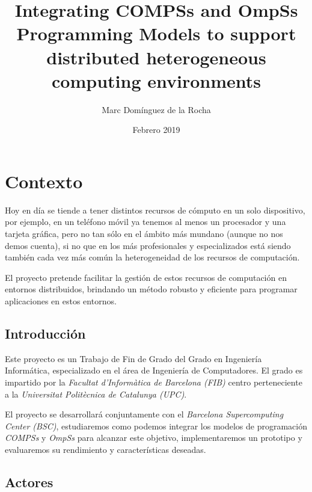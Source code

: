 \documentclass{article}
\title{Integrating COMPSs and OmpSs Programming Models to support distributed heterogeneous computing environments}
\author{Marc Domínguez de la Rocha}
\date{Febrero 2019}
\begin{document}
\maketitle

\newpage
\renewcommand{\contentsname}{Índice}
\tableofcontents
\newpage


\section{Contexto}

Hoy en día se tiende a tener distintos recursos de cómputo en un solo dispositivo, por ejemplo, en un teléfono móvil ya tenemos al menos un procesador y una tarjeta gráfica, pero no tan sólo en el ámbito más mundano (aunque no nos demos cuenta), si no que en los más profesionales y especializados está siendo también cada vez más común la heterogeneidad de los recursos de computación. 
\par\bigskip

El proyecto pretende facilitar la gestión de estos recursos de computación en entornos distribuidos, brindando un método robusto y eficiente para programar aplicaciones en estos entornos.


\subsection{Introducción}

Este proyecto es un Trabajo de Fin de Grado del Grado en Ingeniería Informática, especializado en el área de Ingeniería de Computadores. El grado es impartido por la \textit{Facultat d'Informàtica de Barcelona (FIB)} centro perteneciente a la \textit{Universitat Politècnica de Catalunya (UPC)}. 
\par\bigskip

El proyecto se desarrollará conjuntamente con el \textit{Barcelona Supercomputing Center (BSC)}, estudiaremos como podemos integrar los modelos de programación \textit{COMPSs} y \textit{OmpSs} para alcanzar este objetivo, implementaremos un prototipo y evaluaremos su rendimiento y características deseadas. 

\subsection{Actores}
\end{document}
